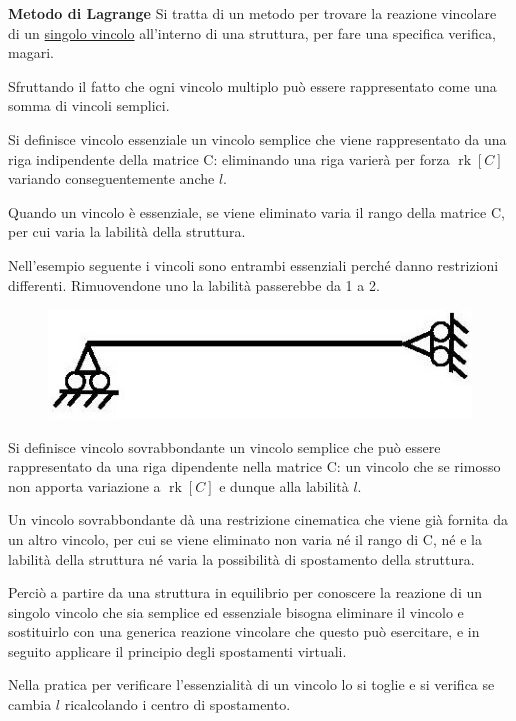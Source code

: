 \documentclass{article}
\DeclareMathOperator{\rk}{rk}
\begin{document}
\begin{adjustwidth}{2in}{}
{\Large \textbf{Metodo di Lagrange}} \mbox{} \newline
Si tratta di un metodo per trovare la reazione vincolare di un \underline{singolo vincolo} all'interno di una struttura, per fare una specifica verifica, magari.

Sfruttando il fatto che ogni vincolo
multiplo può essere rappresentato come una somma di vincoli semplici. \newline

Si definisce
vincolo essenziale un vincolo semplice che viene rappresentato da una riga indipendente
della matrice C: eliminando una riga varierà per forza $\rk[C]$ variando conseguentemente anche $l$.

Quando un vincolo è essenziale, se viene eliminato varia il rango della matrice C, per cui varia la labilità
della struttura. \newline

Nell'esempio seguente i vincoli sono entrambi essenziali perché danno restrizioni
differenti.
Rimuovendone uno la labilità passerebbe da 1 a 2.
\begin{figure}[H]
	\centering
	\includegraphics[width=0.15\linewidth]{immagini/1.PARTE4_Pagina_17}
\end{figure}

Si definisce
vincolo sovrabbondante un vincolo semplice che può essere rappresentato da una riga
dipendente nella matrice C: un vincolo che se rimosso non apporta variazione a $\rk[C]$ e dunque alla labilità $l$.\newline

Un vincolo sovrabbondante dà una restrizione cinematica che viene già fornita da un altro vincolo, per
cui se viene eliminato non varia né il rango di C, né e la labilità della struttura né varia la
possibilità di spostamento della struttura. \newline

Perciò a partire da una struttura in equilibrio per conoscere la reazione di un singolo vincolo che sia semplice
ed essenziale bisogna eliminare il vincolo e sostituirlo con una generica reazione vincolare che questo
può esercitare, e in seguito applicare il principio degli spostamenti virtuali.

Nella pratica per verificare l'essenzialità di un vincolo lo si toglie e si verifica se cambia $l$ ricalcolando i centro di spostamento. \newline


\end{adjustwidth}
\end{document}
